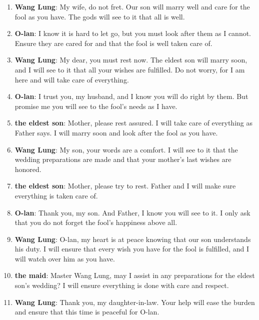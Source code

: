 \documentclass[10pt]{article}
\begin{document}
\begin{enumerate}\setlength{\itemsep}{1pt}\small

\item \textbf{Wang Lung}: My wife, do not fret. Our son will marry well and care for the fool as you have. The gods will see to it that all is well.

\item \textbf{O-lan}: I know it is hard to let go, but you must look after them as I cannot. Ensure they are cared for and that the fool is well taken care of.

\item \textbf{Wang Lung}: My dear, you must rest now. The eldest son will marry soon, and I will see to it that all your wishes are fulfilled. Do not worry, for I am here and will take care of everything.

\item \textbf{O-lan}: I trust you, my husband, and I know you will do right by them. But promise me you will see to the fool's needs as I have.

\item \textbf{the eldest son}: Mother, please rest assured. I will take care of everything as Father says. I will marry soon and look after the fool as you have.

\item \textbf{Wang Lung}: My son, your words are a comfort. I will see to it that the wedding preparations are made and that your mother's last wishes are honored.

\item \textbf{the eldest son}: Mother, please try to rest. Father and I will make sure everything is taken care of.

\item \textbf{O-lan}: Thank you, my son. And Father, I know you will see to it. I only ask that you do not forget the fool's happiness above all.

\item \textbf{Wang Lung}: O-lan, my heart is at peace knowing that our son understands his duty. I will ensure that every wish you have for the fool is fulfilled, and I will watch over him as you have.

\item \textbf{the maid}: Master Wang Lung, may I assist in any preparations for the eldest son's wedding? I will ensure everything is done with care and respect.

\item \textbf{Wang Lung}: Thank you, my daughter-in-law. Your help will ease the burden and ensure that this time is peaceful for O-lan.


\end{enumerate}
\end{document}
